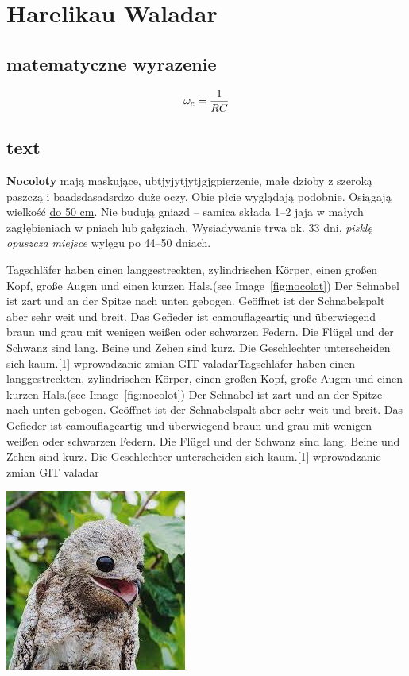 

\newpage
\section{Harelikau Waladar}
\label{sec:text_vharelikau}

\subsection{matematyczne wyrazenie}
    \begin{equation}
              \omega_c = \frac{1}{RC}\\
    \end{equation}

\subsection{text}
    \begin{flushleft}
         \textbf{Nocoloty} mają maskujące,  ubtjyjytjytjgjgpierzenie, małe dzioby z szeroką paszczą i baadsdasadsrdzo duże oczy. Obie płcie wyglądają podobnie. Osiągają wielkość \underline{do 50 cm}. Nie budują gniazd – samica składa 1–2 jaja w małych zagłębieniach w pniach lub gałęziach. Wysiadywanie trwa ok. 33 dni, \textit{pisklę opuszcza miejsce} wylęgu po 44–50 dniach. \par Tagschläfer haben einen langgestreckten, zylindrischen Körper, einen großen Kopf, große Augen und einen kurzen Hals.(see Image~\ref{fig:nocolot}) Der Schnabel ist zart und an der Spitze nach unten gebogen. Geöffnet ist der Schnabelspalt aber sehr weit und breit. Das Gefieder ist camouflageartig und überwiegend braun und grau mit wenigen weißen oder schwarzen Federn. Die Flügel und der Schwanz sind lang. Beine und Zehen sind kurz. Die Geschlechter unterscheiden sich kaum.[1]
        wprowadzanie zmian GIT valadarTagschläfer haben einen langgestreckten, zylindrischen Körper, einen großen Kopf, große Augen und einen kurzen Hals.(see Image~\ref{fig:nocolot}) Der Schnabel ist zart und an der Spitze nach unten gebogen. Geöffnet ist der Schnabelspalt aber sehr weit und breit. Das Gefieder ist camouflageartig und überwiegend braun und grau mit wenigen weißen oder schwarzen Federn. Die Flügel und der Schwanz sind lang. Beine und Zehen sind kurz. Die Geschlechter unterscheiden sich kaum.[1]
        wprowadzanie zmian GIT valadar

             \centering
             \includegraphics{pictures/nocolot.jpg}
             \label{fig:nocolot}
         
\end{flushleft}
